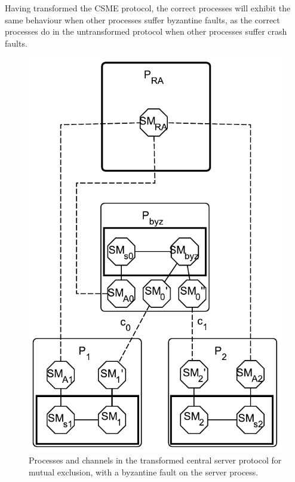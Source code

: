 \documentclass{article}
\begin{document}
		Having transformed the CSME protocol, the correct processes will exhibit the same behaviour when other processes suffer byzantine faults, as the correct processes do in the untransformed protocol when other processes suffer crash faults.

		\FloatBarrier
		\begin{figure}[ht!]
			\center
			\includegraphics[scale=0.6]{figures/state-machines/CSME-protocol-transformed-byzantine.pdf}
			\caption{Processes and channels in the transformed central server protocol for mutual exclusion, with a byzantine fault on the server process.}
			\label{fig:CSME-protocol-transformed-byzantine}
		\end{figure}
		\FloatBarrier
\end{document}
